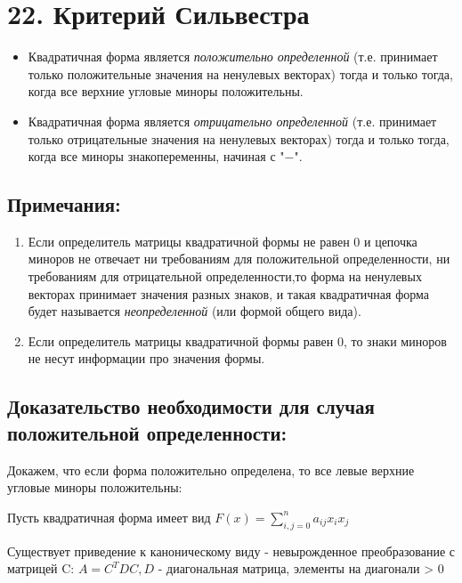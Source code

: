 \documentclass[12pt]{article}
\begin{document}
    \section{22. Критерий Сильвестра}
    \begin{itemize}
        \item Квадратичная форма является
              \textit{положительно определенной} (т.е.
              принимает только положительные значения
              на ненулевых векторах) тогда и только тогда,
              когда все верхние угловые миноры положительны.
        \item Квадратичная форма является
              \textit{отрицательно определенной} (т.е.
              принимает только отрицательные значения
              на ненулевых векторах) тогда и только тогда,
              когда все миноры знакопеременны, начиная с "$-$".
    \end{itemize}
    \subsection{Примечания:}

    \begin{enumerate}
        \item Если определитель матрицы квадратичной формы не равен 0 и цепочка миноров не отвечает ни требованиям для положительной определенности, ни требованиям для отрицательной определенности,то форма на ненулевых векторах принимает значения разных знаков, и такая квадратичная форма будет называется  \textit{неопределенной} (или формой общего вида).
        \item Если определитель матрицы квадратичной формы равен 0, то знаки миноров не несут информации про значения формы.
    \end{enumerate}

    \subsection{Доказательство необходимости для случая положительной определенности:}

    Докажем, что если форма положительно определена, то все левые верхние угловые миноры положительны:

    Пусть квадратичная форма имеет вид $F(x) = \sum\limits_{i,j=0}^n a_{ij} x_{i} x_{j}$

    Существует приведение к каноническому виду - невырожденное преобразование с матрицей C:
$A = C^{T}DC, D$ - диагональная матрица, элементы на диагонали > 0
\end{document}
